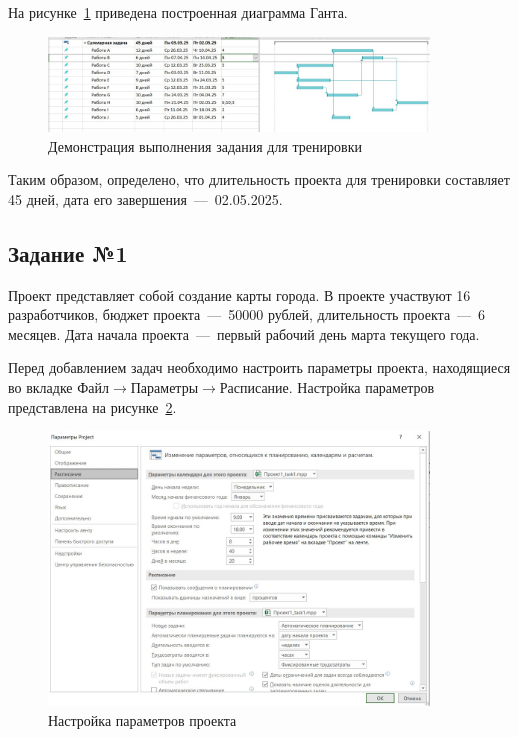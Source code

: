 На рисунке~\ref{fig:test} приведена построенная диаграмма Ганта.

\begin{figure}[H]
	\centering
	\includegraphics[width=0.9\textwidth]{img/lab1/test/test.jpg}
	\caption{Демонстрация выполнения задания для тренировки}
	\label{fig:test}
\end{figure}

Таким образом, определено, что длительность проекта для тренировки составляет 45 дней, дата его завершения~---~02.05.2025.

\subsection{Задание №1}

Проект представляет собой создание карты города.
В проекте участвуют 16 разработчиков, бюджет проекта~---~50000 рублей, длительность проекта~---~6 месяцев.
Дата начала проекта~---~первый рабочий день марта текущего года.

Перед добавлением задач необходимо настроить параметры проекта, находящиеся во вкладке $\text{Файл} \rightarrow \text{Параметры} \rightarrow \text{Расписание}$.
Настройка параметров представлена на рисунке~\ref{fig:parameters}.

\begin{figure}[H]
	\centering
	\includegraphics[width=0.9\textwidth]{img/lab1/task1/parameters.jpg}
	\caption{Настройка параметров проекта}
	\label{fig:parameters}
\end{figure}

